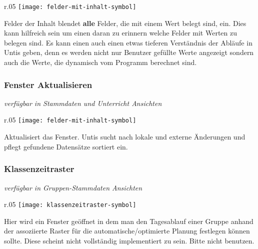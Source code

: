 \begin{wrapfigure}{r}{.05\textwidth}
	\vspace{-50pt}
	\texttt{[image: felder-mit-inhalt-symbol]}
	\vspace{-35pt}
\end{wrapfigure}

\noindent
Felder der Inhalt blendet \textbf{alle} Felder, die mit einem Wert belegt sind, ein. Dies kann hilfreich sein um einen daran zu erinnern welche Felder mit Werten zu belegen sind. Es kann einen auch einen etwas tieferen Verständnis der Abläufe in Untis geben, denn es werden nicht nur Benutzer gefüllte Werte angezeigt sondern auch die Werte, die dynamisch vom Programm berechnet sind.\\

\subsubsection{Fenster Aktualisieren}
{\small\textit{verfügbar in Stammdaten und Unterricht Ansichten\\}\par}

\begin{wrapfigure}{r}{.05\textwidth}
	\vspace{-50pt}
	\texttt{[image: felder-mit-inhalt-symbol]}
	\vspace{-35pt}
\end{wrapfigure}

\noindent
Aktualisiert das Fenster. Untis sucht nach lokale und externe Änderungen und pflegt gefundene Datensätze sortiert ein. \\

\subsubsection{Klassenzeitraster}
{\small\textit{verfügbar in Gruppen-Stammdaten Ansichten\\}\par}

\begin{wrapfigure}{r}{.05\textwidth}
	\vspace{-50pt}
	\texttt{[image: klassenzeitraster-symbol]}
	\vspace{-35pt}
\end{wrapfigure}

\noindent
Hier wird ein Fenster geöffnet in dem man den Tagesablauf einer Gruppe anhand der assoziierte Raster für die automatische/optimierte Planung festlegen können sollte. Diese scheint nicht vollständig implementiert zu sein. Bitte nicht benutzen.

